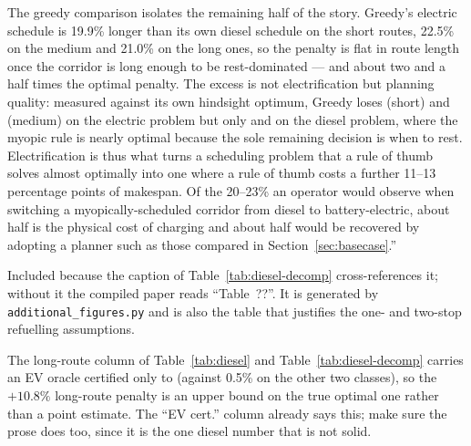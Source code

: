 \begin{anew}
\medskip
The greedy comparison isolates the remaining half of the story. Greedy's electric
schedule is 19.9\% longer than its own diesel schedule on the short routes, 22.5\%
on the medium and 21.0\% on the long ones, so the penalty is flat in route length
once the corridor is long enough to be rest-dominated --- and about two and a half
times the optimal penalty. The excess is not electrification but planning
quality: measured against its own hindsight optimum, Greedy loses 
(short) and  (medium) on the electric problem but only 
and  on the diesel problem, where the myopic rule is nearly optimal
because the sole remaining decision is when to rest. Electrification is thus what
turns a scheduling problem that a rule of thumb solves almost optimally into one
where a rule of thumb costs a further 11--13 percentage points of makespan. Of
the 20--23\% an operator would observe when switching a myopically-scheduled
corridor from diesel to battery-electric, about half is the physical cost of
charging and about half would be recovered by adopting a planner such as those
compared in Section~\ref{sec:basecase}.''
\end{anew}





\begin{acmt}
Included because the caption of Table~\ref{tab:diesel-decomp} cross-references it;
without it the compiled paper reads ``Table~??''. It is generated by \texttt{additional\_figures.py}
and is also the table that justifies the one- and two-stop refuelling assumptions.
\end{acmt}

\begin{acmt}
The long-route column of Table~\ref{tab:diesel} and
Table~\ref{tab:diesel-decomp} carries an EV oracle certified only to
 (against 0.5\% on the other two classes), so the $+10.8\%$ long-route
penalty is an upper bound on the true optimal one rather than a point estimate.
The ``EV cert.'' column already says this; make sure the prose does too, since
it is the one diesel number that is not solid.
\end{acmt}

